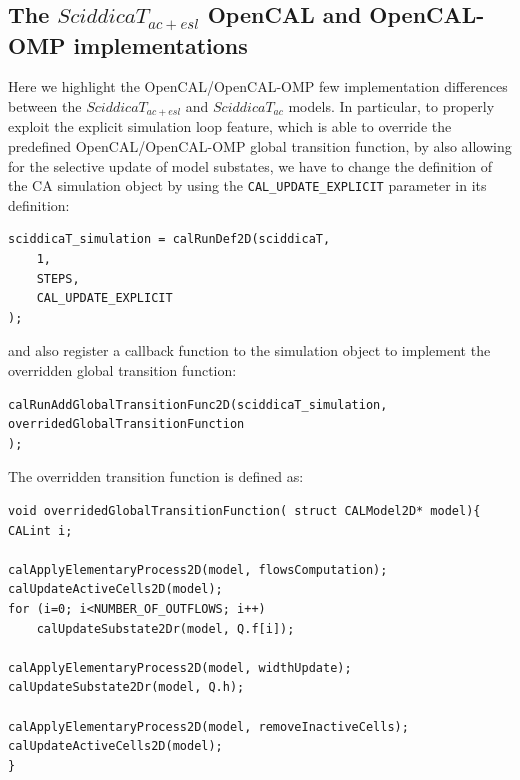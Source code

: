 \subsection{The $SciddicaT_{ac+esl}$ OpenCAL and OpenCAL-OMP implementations}
Here we highlight the OpenCAL/OpenCAL-OMP few implementation
differences between the $SciddicaT_{ac+esl}$ and $SciddicaT_{ac}$
models. In particular, to properly exploit the explicit simulation
loop feature, which is able to override the predefined
OpenCAL/OpenCAL-OMP global transition function, by also allowing
for the selective update of model substates, we have to change the
definition of the CA simulation object by using the
\verb'CAL_UPDATE_EXPLICIT' parameter in its definition:
\begin{lstlisting}
sciddicaT_simulation = calRunDef2D(sciddicaT,
	1,
	STEPS,
	CAL_UPDATE_EXPLICIT
);
\end{lstlisting}

\noindent and also register a callback function to the simulation object to
implement the overridden global transition function:

\begin{lstlisting}
calRunAddGlobalTransitionFunc2D(sciddicaT_simulation,
overridedGlobalTransitionFunction
);
\end{lstlisting}

\noindent The overridden transition function is defined as:
\begin{lstlisting}
void overridedGlobalTransitionFunction( struct CALModel2D* model){
CALint i;

calApplyElementaryProcess2D(model, flowsComputation);
calUpdateActiveCells2D(model);
for (i=0; i<NUMBER_OF_OUTFLOWS; i++)
	calUpdateSubstate2Dr(model, Q.f[i]);

calApplyElementaryProcess2D(model, widthUpdate);
calUpdateSubstate2Dr(model, Q.h);

calApplyElementaryProcess2D(model, removeInactiveCells);
calUpdateActiveCells2D(model);
}
\end{lstlisting}

